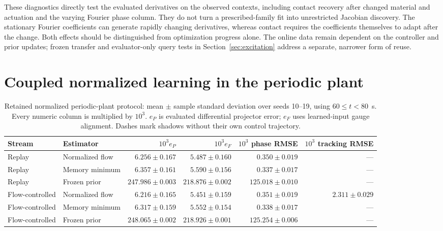 \documentclass[journal]{IEEEtran}
\begin{document}
These diagnostics directly test the evaluated derivatives on the observed
contexts, including contact recovery after changed material and actuation
and the varying Fourier phase column. They do not turn a prescribed-family
fit into unrestricted Jacobian discovery. The stationary Fourier
coefficients can generate rapidly changing derivatives, whereas contact
requires the coefficients themselves to adapt after the change. Both
effects should be distinguished from optimization progress alone.
The online data remain dependent on the controller and prior updates;
frozen transfer and evaluator-only query tests in Section~\ref{sec:excitation}
address a separate, narrower form of reuse.
%
\section{Coupled normalized learning in the periodic plant}
\label{sec:normalized_fourier_results}
\begin{table}[t]
\centering
\caption{Retained normalized periodic-plant protocol: mean $\pm$ sample standard deviation over seeds 10--19, using $60\le t<80$~s. Every numeric column is multiplied by $10^3$. $e_P$ is evaluated differential projector error; $e_F$ uses learned-input gauge alignment. Dashes mark shadows without their own control trajectory.}
\label{tab:normalized_fourier_results}
\begin{tabular}{llrrrr}
\toprule
Stream & Estimator & $10^3 e_P$ & $10^3 e_F$ & $10^3$ phase RMSE & $10^3$ tracking RMSE \\
\midrule
Replay & Normalized flow & $6.256\pm0.167$ & $5.487\pm0.160$ & $0.350\pm0.019$ & --- \\
Replay & Memory minimum & $6.357\pm0.161$ & $5.590\pm0.156$ & $0.337\pm0.017$ & --- \\
Replay & Frozen prior & $247.986\pm0.003$ & $218.876\pm0.002$ & $125.018\pm0.010$ & --- \\
Flow-controlled & Normalized flow & $6.216\pm0.165$ & $5.451\pm0.159$ & $0.351\pm0.019$ & $2.311\pm0.029$ \\
Flow-controlled & Memory minimum & $6.317\pm0.159$ & $5.552\pm0.154$ & $0.338\pm0.017$ & --- \\
Flow-controlled & Frozen prior & $248.065\pm0.002$ & $218.926\pm0.001$ & $125.254\pm0.006$ & --- \\
\bottomrule
\end{tabular}
\end{table}
\end{document}
